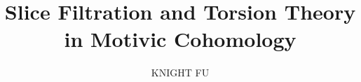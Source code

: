 \documentclass{ruthesis}
\numberwithin{equation}{section}
\theoremstyle{plain} %
\theoremstyle{definition}
\begin{document}
 
\phd 
\title{Slice Filtration and Torsion Theory in Motivic Cohomology}
\author{KNIGHT FU}

\beforepreface 
{}

\dedication{The body of the dedication} 

\afterpreface 










% 








\end{document}
